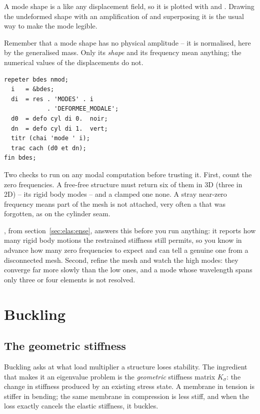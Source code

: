 \begin{castemcom}
A mode shape is a  like any displacement field, so it is plotted
with   and . Drawing
the undeformed shape with an amplification of  and superposing it is
the usual way to make the mode legible.

\medskip
Remember that a mode shape has no physical amplitude -- it is normalised, here
by the generalised mass. Only its \emph{shape} and its frequency mean
anything; the numerical values of the displacements do not.
\end{castemcom}
\begin{castemlines}
\begin{verbatim}
repeter bdes nmod;
  i   = &bdes;
  di  = res . 'MODES' . i
            . 'DEFORMEE_MODALE';
  d0  = defo cyl di 0.  noir;
  dn  = defo cyl di 1.  vert;
  titr (chai 'mode ' i);
  trac cach (d0 et dn);
fin bdes;
\end{verbatim}
\end{castemlines}

%
\noindent Two checks to run on any modal computation before trusting it.
First, count the zero frequencies. A free-free structure must return six of
them in 3D (three in 2D) -- its rigid body modes -- and a clamped one none.
A stray near-zero frequency means part of the mesh is not attached, very
often a  that was forgotten, as on the cylinder seam.

, from section~\ref{sec:elas:ense}, answers this before you
run anything: it reports how many rigid body motions the restrained stiffness
still permits, so you know in advance how many zero frequencies to expect and
can tell a genuine one from a disconnected mesh. Second, refine the
mesh and watch the high modes: they converge far more slowly than the low
ones, and a mode whose wavelength spans only three or four elements is not
resolved.

\section{Buckling}

\subsection{The geometric stiffness}

Buckling asks at what load multiplier a structure loses stability. %
The
ingredient that makes it an eigenvalue problem is the \emph{geometric}
stiffness matrix $K_{\sigma}$: the change in stiffness produced by an existing
stress state. A membrane in tension is stiffer in bending; the same membrane
in compression is less stiff, and when the loss exactly cancels the elastic
stiffness, it buckles.

